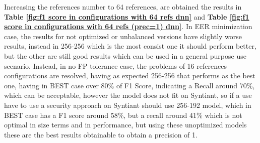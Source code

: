 Increasing the references number to 64 references, are obtained the results in \textbf{Table \ref{fig:f1 score in configurations with 64 refs dnn}} and \textbf{Table \ref{fig:f1 score in configurations with 64 refs (prec=1) dnn}}. In EER minimization case, the results for not optimized or unbalanced versions have slightly worse results, instead in 256-256 which is the most consist one it should perform better, 
but the other are still good results which can be used in a general purpose use scenario. Instead, in no FP tolerance case, the problems of 16 references configurations are resolved, having as expected 256-256 that performs as the best one, having in BEST case over 80\% of F1 Score, indicating a Recall around 70\%, which can be acceptable, however the model does not fit on Syntiant, so if a use have to use a security approach on Syntiant should use 256-192 model, which in BEST case has a F1 score around 58\%, but a recall around 41\% which is not optimal in size terms and in performance, but using these unoptimized models these are the best results obtainable to obtain a precision of 1.
